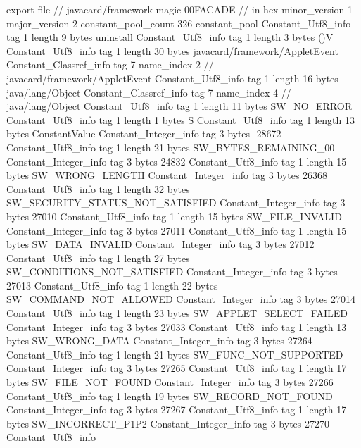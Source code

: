 export file {		// javacard/framework
	magic	00FACADE		 // in hex
	minor_version	1
	major_version	2
	constant_pool_count	326
	constant_pool {
		Constant_Utf8_info {
			tag	1
			length	9
			bytes	uninstall
		}
		Constant_Utf8_info {
			tag	1
			length	3
			bytes	()V
		}
		Constant_Utf8_info {
			tag	1
			length	30
			bytes	javacard/framework/AppletEvent
		}
		Constant_Classref_info {
			tag	7
			name_index	2		// javacard/framework/AppletEvent
		}
		Constant_Utf8_info {
			tag	1
			length	16
			bytes	java/lang/Object
		}
		Constant_Classref_info {
			tag	7
			name_index	4		// java/lang/Object
		}
		Constant_Utf8_info {
			tag	1
			length	11
			bytes	SW_NO_ERROR
		}
		Constant_Utf8_info {
			tag	1
			length	1
			bytes	S
		}
		Constant_Utf8_info {
			tag	1
			length	13
			bytes	ConstantValue
		}
		Constant_Integer_info {
			tag	3
			bytes	-28672
		}
		Constant_Utf8_info {
			tag	1
			length	21
			bytes	SW_BYTES_REMAINING_00
		}
		Constant_Integer_info {
			tag	3
			bytes	24832
		}
		Constant_Utf8_info {
			tag	1
			length	15
			bytes	SW_WRONG_LENGTH
		}
		Constant_Integer_info {
			tag	3
			bytes	26368
		}
		Constant_Utf8_info {
			tag	1
			length	32
			bytes	SW_SECURITY_STATUS_NOT_SATISFIED
		}
		Constant_Integer_info {
			tag	3
			bytes	27010
		}
		Constant_Utf8_info {
			tag	1
			length	15
			bytes	SW_FILE_INVALID
		}
		Constant_Integer_info {
			tag	3
			bytes	27011
		}
		Constant_Utf8_info {
			tag	1
			length	15
			bytes	SW_DATA_INVALID
		}
		Constant_Integer_info {
			tag	3
			bytes	27012
		}
		Constant_Utf8_info {
			tag	1
			length	27
			bytes	SW_CONDITIONS_NOT_SATISFIED
		}
		Constant_Integer_info {
			tag	3
			bytes	27013
		}
		Constant_Utf8_info {
			tag	1
			length	22
			bytes	SW_COMMAND_NOT_ALLOWED
		}
		Constant_Integer_info {
			tag	3
			bytes	27014
		}
		Constant_Utf8_info {
			tag	1
			length	23
			bytes	SW_APPLET_SELECT_FAILED
		}
		Constant_Integer_info {
			tag	3
			bytes	27033
		}
		Constant_Utf8_info {
			tag	1
			length	13
			bytes	SW_WRONG_DATA
		}
		Constant_Integer_info {
			tag	3
			bytes	27264
		}
		Constant_Utf8_info {
			tag	1
			length	21
			bytes	SW_FUNC_NOT_SUPPORTED
		}
		Constant_Integer_info {
			tag	3
			bytes	27265
		}
		Constant_Utf8_info {
			tag	1
			length	17
			bytes	SW_FILE_NOT_FOUND
		}
		Constant_Integer_info {
			tag	3
			bytes	27266
		}
		Constant_Utf8_info {
			tag	1
			length	19
			bytes	SW_RECORD_NOT_FOUND
		}
		Constant_Integer_info {
			tag	3
			bytes	27267
		}
		Constant_Utf8_info {
			tag	1
			length	17
			bytes	SW_INCORRECT_P1P2
		}
		Constant_Integer_info {
			tag	3
			bytes	27270
		}
		Constant_Utf8_info {
}}}
